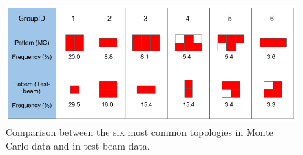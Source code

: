 \begin{figure}
  \centering
  \includegraphics[scale=0.5]{figures/quadratini.png}
  \caption{Comparison between the six most common topologies in Monte Carlo data and in test-beam data.}
  \label{fig:quadratini}
\end{figure}
%